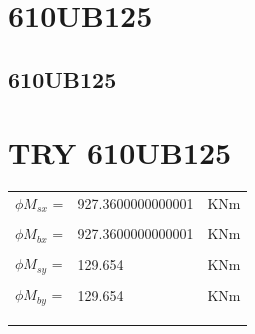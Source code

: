 \documentclass{article}%
\begin{document}
\section{610UB125}%
\label{sec:610UB125}%

%
\subsection{610UB125}%
\label{subsec:610UB125}%

%
\section*{TRY 610UB125}%
\label{sec:TRY610UB125}%
\begin{tabular}{lll}%
$\phi M_{sx}$ =  &927.3600000000001& KNm\\%
&&\\%
$\phi M_{bx}$ =  &927.3600000000001& KNm\\%
&&\\%
$\phi M_{sy}$ =  &129.654& KNm\\%
&&\\%
$\phi M_{by}$ =  &129.654& KNm\\%
&&\\%
&&\\%
&&\\%
\end{tabular}

%
\end{document}

